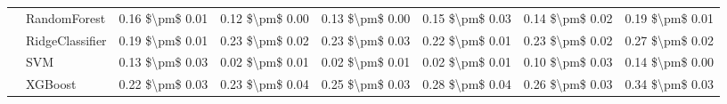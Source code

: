 \begin{tabular}{llllllll}
   & RandomForest &      0.16 \$\textbackslash pm\$ 0.01 &           0.12 \$\textbackslash pm\$ 0.00 &       0.13 \$\textbackslash pm\$ 0.00 &        0.15 \$\textbackslash pm\$ 0.03 &                         0.14 \$\textbackslash pm\$ 0.02 &      0.19 \$\textbackslash pm\$ 0.01 \\
   & RidgeClassifier &      0.19 \$\textbackslash pm\$ 0.01 &           0.23 \$\textbackslash pm\$ 0.02 &       0.23 \$\textbackslash pm\$ 0.03 &        0.22 \$\textbackslash pm\$ 0.01 &                         0.23 \$\textbackslash pm\$ 0.02 &      0.27 \$\textbackslash pm\$ 0.02 \\
   & SVM &      0.13 \$\textbackslash pm\$ 0.03 &           0.02 \$\textbackslash pm\$ 0.01 &       0.02 \$\textbackslash pm\$ 0.01 &        0.02 \$\textbackslash pm\$ 0.01 &                         0.10 \$\textbackslash pm\$ 0.03 &      0.14 \$\textbackslash pm\$ 0.00 \\
   & XGBoost &      0.22 \$\textbackslash pm\$ 0.03 &           0.23 \$\textbackslash pm\$ 0.04 &       0.25 \$\textbackslash pm\$ 0.03 &        0.28 \$\textbackslash pm\$ 0.04 &                         0.26 \$\textbackslash pm\$ 0.03 &      0.34 \$\textbackslash pm\$ 0.03 \\
\bottomrule
\end{tabular}
